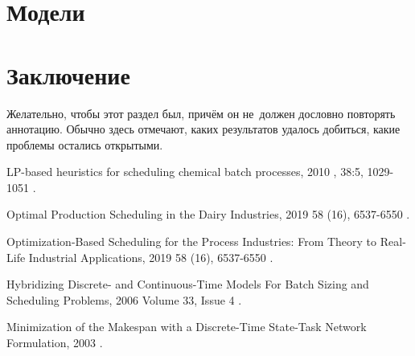 \documentclass[12pt, twoside]{article}
\theoremstyle{definition}
\begin{document}
\section{Модели}

\section{Заключение}
Желательно, чтобы этот раздел был, причём он не~должен дословно повторять аннотацию.
Обычно здесь отмечают, каких результатов удалось добиться, какие проблемы остались открытыми.

\begin{thebibliography}{99}

    LP-based heuristics for scheduling chemical batch processes, 2010
    , 38:5, 1029-1051
	.

    Optimal Production Scheduling in the Dairy Industries, 2019
     58 (16), 6537-6550
	.
	
    Optimization-Based Scheduling for the Process Industries: From Theory to Real-Life Industrial Applications, 2019
     58 (16), 6537-6550
	.
	
    Hybridizing Discrete- and Continuous-Time Models For Batch Sizing and
Scheduling Problems, 2006
     Volume 33, Issue 4
	.
	
    Minimization of the Makespan with a Discrete-Time State-Task Network Formulation, 2003
	.
	

\end{thebibliography}
\end{document}
